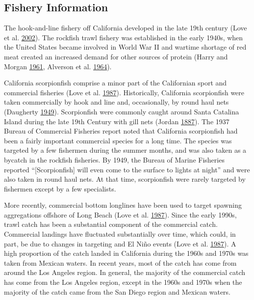 \documentclass[12pt,]{article}
\begin{document}
\subsection{Fishery Information}\label{fishery-information}

The hook-and-line fishery off California developed in the late 19th
century (Love et al. \protect\hyperlink{ref-Love2002}{2002}). The
rockfish trawl fishery was established in the early 1940s, when the
United States became involved in World War II and wartime shortage of
red meat created an increased demand for other sources of protein (Harry
and Morgan \protect\hyperlink{ref-Harry1961}{1961}, Alverson et al.
\protect\hyperlink{ref-Alverson1964}{1964}).

California scorpionfish comprise a minor part of the Californian sport
and commercial fisheries (Love et al.
\protect\hyperlink{ref-Love1987}{1987}). Historically, California
scorpionfish were taken commercially by hook and line and, occasionally,
by round haul nets (Daugherty
\protect\hyperlink{ref-Daugherty1949}{1949}). Scorpionfish were commonly
caught around Santa Catalina Island during the late 19th Century with
gill nets (Jordan \protect\hyperlink{ref-Jordan1887}{1887}). The 1937
Bureau of Commercial Fisheries report noted that California scorpionfish
had been a fairly important commercial species for a long time. The
species was targeted by a few fishermen during the summer months, and
was also taken as a bycatch in the rockfish fisheries. By 1949, the
Bureau of Marine Fisheries reported ``{[}Scorpionfish{]} will even come
to the surface to lights at night'' and were also taken in round haul
nets. At that time, scorpionfish were rarely targeted by fishermen
except by a few specialists.

More recently, commercial bottom longlines have been used to target
spawning aggregations offshore of Long Beach (Love et al.
\protect\hyperlink{ref-Love1987}{1987}). Since the early 1990s, trawl
catch has been a substantial component of the commercial catch.
Commercial landings have fluctuated substantially over time, which
could, in part, be due to changes in targeting and El
\(\text{Ni\~{n}o}\) events (Love et al.
\protect\hyperlink{ref-Love1987}{1987}). A high proportion of the catch
landed in California during the 1960s and 1970s was taken from Mexican
waters. In recent years, most of the catch has come from around the Los
Angeles region. In general, the majority of the commercial catch has
come from the Los Angeles region, except in the 1960s and 1970s when the
majority of the catch came from the San Diego region and Mexican waters.
\end{document}
